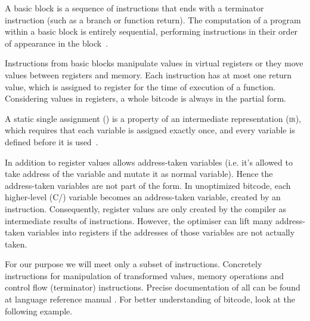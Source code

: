 \begin{definition}\label{def:basicblock}
A basic block is a sequence of instructions that ends with a terminator
instruction (such as a branch or function return). The computation of a program
within a basic block is entirely sequential, performing instructions in their
order of appearance in the block~\cite{Rockai15}.
\end{definition}

Instructions from basic blocks manipulate values in virtual registers or
they move values between registers and memory. Each instruction has at most one
return value, which is assigned to register for the time of execution of a
function. Considering values in registers, a whole \LLVM bitcode is always in the
partial \SSA form.

\begin{definition}\label{def:ssa}
A static single assignment (\SSA{}) is a property of an intermediate representation
(\textsc{ir}), which requires that each variable is assigned exactly once, and every
variable is defined before it is used~\cite{Cytron91}.
\end{definition}

In addition to register values \LLVMIR allows address-taken variables (i.e. it's
allowed to take address of the variable and mutate it as normal variable).
Hence the address-taken variables are not part of the \SSA form. In unoptimized
\LLVM bitcode, each higher-level (C/\Cpp{}) variable becomes an address-taken
variable, created by an  instruction. Consequently, register values are only
created by the compiler as intermediate results of instructions. However, the \LLVM
optimiser can lift many address-taken variables into registers if the addresses
of those variables are not actually taken.

For our purpose we will meet only a subset of \LLVM instructions. Concretely
instructions for manipulation of transformed values, memory operations and
control flow (terminator) instructions. Precise documentation of all can be
found at \LLVM language reference manual \cite{LLVM:langref}. For better
understanding of \LLVM bitcode, look at the following example.


